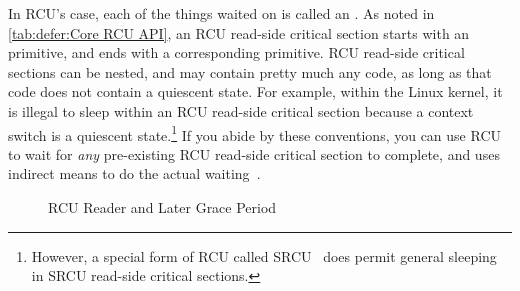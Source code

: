 In RCU's case, each of the things waited on is called an
\emph{}.
As noted in
\cref{tab:defer:Core RCU API}, an RCU read-side critical
section starts with an  primitive, and ends with a
corresponding  primitive.
RCU read-side critical sections can be nested, and may contain pretty
much any code, as long as that code does not contain a quiescent state.
For example, within the Linux kernel, it is illegal to sleep within
an RCU read-side critical section because a context switch is a quiescent
state.\footnote{
	However, a special form of RCU called SRCU~\cite{PaulEMcKenney2006c}
	does permit general sleeping in SRCU read-side critical sections.}
If you abide by these conventions, you can use RCU to wait for \emph{any}
pre-existing RCU read-side critical section to complete, and
 uses indirect means to do the actual
waiting~\cite{MathieuDesnoyers2012URCU,McKenney:2013:SDS:2483852.2483867}.

\begin{figure}
\centering
{}
\caption{RCU Reader and Later Grace Period}
\label{fig:defer:RCU Reader and Later Grace Period}
\end{figure}

